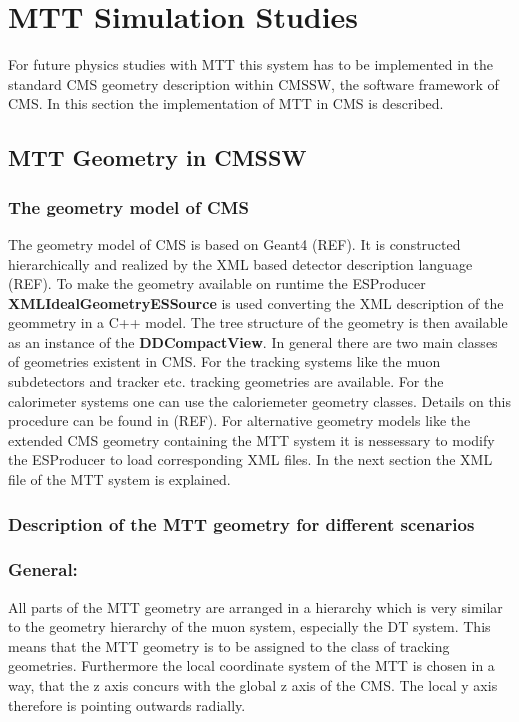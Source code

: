 \section{MTT Simulation Studies}
For future physics studies with MTT this system has to be implemented in the standard CMS geometry description within CMSSW, the software framework of CMS.
In this section the implementation of MTT in CMS is described.
\subsection{MTT Geometry in CMSSW}
	\subsubsection{The geometry model of CMS}
	The geometry model of CMS is based on Geant4 (REF).
	It is constructed hierarchically and realized by the XML based detector description language (REF).
	To make the geometry available on runtime the ESProducer \textbf{XMLIdealGeometryESSource} is used converting the XML description of the geommetry in a C++ model.
	The tree structure of the geometry is then available as an instance of the \textbf{DDCompactView}.
	In general there are two main classes of geometries existent in CMS.
	For the tracking systems like the muon subdetectors and tracker etc. tracking geometries are available.
	For the calorimeter systems one can use the caloriemeter geometry classes.
	Details on this procedure can be found in (REF).
	For alternative geometry models like the extended CMS geometry containing the MTT system it is nessessary to modify the ESProducer to load corresponding XML files.
	In the next section the XML file of the MTT system is explained.
	\subsubsection{Description of the MTT geometry for different scenarios}
		\subsubsection*{General:}
		All parts of the MTT geometry are arranged in a hierarchy which is very similar to the geometry hierarchy of the muon system, especially the DT system.
		This means that the MTT geometry is to be assigned to the class of tracking geometries.
		Furthermore the local coordinate system of the MTT is chosen in a way, that the z axis concurs with the global z axis of the CMS.
		The local y axis therefore is pointing outwards radially.
